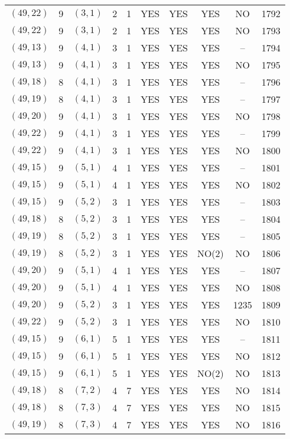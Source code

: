 \begin{longtable}{|c|c|c|c|c|c|c|c|c|c|}
$(49, 22)$ & 9 & $(3, 1)$ & 2 & 1 & YES & YES & YES & NO & 1792\\
$(49, 22)$ & 9 & $(3, 1)$ & 2 & 1 & YES & YES & YES & NO & 1793\\
$(49, 13)$ & 9 & $(4, 1)$ & 3 & 1 & YES & YES & YES & -- & 1794\\
$(49, 13)$ & 9 & $(4, 1)$ & 3 & 1 & YES & YES & YES & NO & 1795\\
$(49, 18)$ & 8 & $(4, 1)$ & 3 & 1 & YES & YES & YES & -- & 1796\\
$(49, 19)$ & 8 & $(4, 1)$ & 3 & 1 & YES & YES & YES & -- & 1797\\
$(49, 20)$ & 9 & $(4, 1)$ & 3 & 1 & YES & YES & YES & NO & 1798\\
$(49, 22)$ & 9 & $(4, 1)$ & 3 & 1 & YES & YES & YES & -- & 1799\\
$(49, 22)$ & 9 & $(4, 1)$ & 3 & 1 & YES & YES & YES & NO & 1800\\
$(49, 15)$ & 9 & $(5, 1)$ & 4 & 1 & YES & YES & YES & -- & 1801\\
$(49, 15)$ & 9 & $(5, 1)$ & 4 & 1 & YES & YES & YES & NO & 1802\\
$(49, 15)$ & 9 & $(5, 2)$ & 3 & 1 & YES & YES & YES & -- & 1803\\
$(49, 18)$ & 8 & $(5, 2)$ & 3 & 1 & YES & YES & YES & -- & 1804\\
$(49, 19)$ & 8 & $(5, 2)$ & 3 & 1 & YES & YES & YES & -- & 1805\\
$(49, 19)$ & 8 & $(5, 2)$ & 3 & 1 & YES & YES & NO(2) & NO & 1806\\
$(49, 20)$ & 9 & $(5, 1)$ & 4 & 1 & YES & YES & YES & -- & 1807\\
$(49, 20)$ & 9 & $(5, 1)$ & 4 & 1 & YES & YES & YES & NO & 1808\\
$(49, 20)$ & 9 & $(5, 2)$ & 3 & 1 & YES & YES & YES & 1235 & 1809\\
$(49, 22)$ & 9 & $(5, 2)$ & 3 & 1 & YES & YES & YES & NO & 1810\\
$(49, 15)$ & 9 & $(6, 1)$ & 5 & 1 & YES & YES & YES & -- & 1811\\
$(49, 15)$ & 9 & $(6, 1)$ & 5 & 1 & YES & YES & YES & NO & 1812\\
$(49, 15)$ & 9 & $(6, 1)$ & 5 & 1 & YES & YES & NO(2) & NO & 1813\\
$(49, 18)$ & 8 & $(7, 2)$ & 4 & 7 & YES & YES & YES & NO & 1814\\
$(49, 18)$ & 8 & $(7, 3)$ & 4 & 7 & YES & YES & YES & NO & 1815\\
$(49, 19)$ & 8 & $(7, 3)$ & 4 & 7 & YES & YES & YES & NO & 1816\\

\end{longtable}
